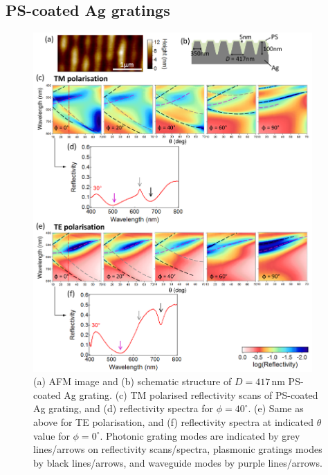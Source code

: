 \subsection{PS-coated Ag gratings}
\begin{figure}[h!] 
\centering    
\includegraphics[width=0.95\textwidth]{Fig11}
\caption[(a) AFM image and (b) schematic structure of $D=417$\,nm PS-coated Ag grating. Reflectivity measurements of PS-coated Ag grating in (c,d) TM and (e.f) TE polarisation.]{(a) AFM image and (b) schematic structure of $D=417$\,nm PS-coated Ag grating. (c) TM polarised reflectivity scans of PS-coated Ag grating, and (d) reflectivity spectra for $\phi=40^{\circ}$. (e) Same as above for TE polarisation, and (f) reflectivity spectra at indicated $\theta$ value for $\phi=0^{\circ}$. Photonic grating modes are indicated by grey lines/arrows on reflectivity scans/spectra, plasmonic gratings modes by black lines/arrows, and waveguide modes by purple lines/arrows.}
\label{7Fig11}
\end{figure}
